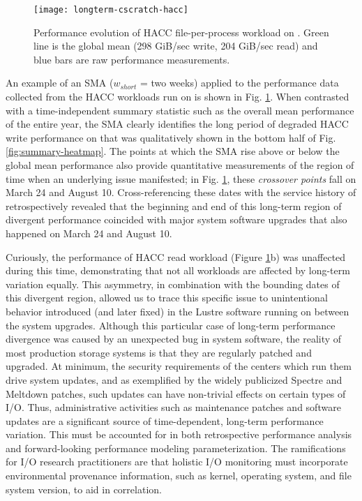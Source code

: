 \begin{figure}
    \centering
    \texttt{[image: longterm-cscratch-hacc]}
    \vspace{-.35in}
    \caption{Performance evolution of HACC file-per-process workload on \cori.  Green line is the global mean (298 GiB/sec write, 204 GiB/sec read) and blue bars are raw performance measurements.}
    \label{fig:timeseries-baseline}
\end{figure}


An example of an SMA ($w_{short}$ = two weeks) applied to the performance data collected from the HACC workloads run on \cori is shown in Fig. \ref{fig:timeseries-baseline}.
When contrasted with a time-independent summary statistic such as the overall mean performance of the entire year, the SMA clearly identifies the long period of degraded HACC write performance on \cori that was qualitatively shown in the bottom half of Fig. \ref{fig:summary-heatmap}.
The points at which the SMA rise above or below the global mean performance also provide quantitative measurements of the region of time when an underlying issue manifested;
in Fig. \ref{fig:timeseries-baseline}, these \emph{crossover points} fall on March 24 and August 10.
Cross-referencing these dates with the service history of \cori retrospectively revealed that the beginning and end of this long-term region of divergent performance coincided with major system software upgrades that also happened on March 24 and August 10.

Curiously, the performance of HACC read workload (Figure \ref{fig:timeseries-baseline}b) was unaffected during this time, demonstrating that not all workloads are affected by long-term variation equally.
This asymmetry, in combination with the bounding dates of this divergent region, allowed us to trace this specific issue to unintentional behavior introduced (and later fixed) in the Lustre software running on \cori between the system upgrades.
Although this particular case of long-term performance divergence was caused by an unexpected bug in system software, the reality of most production storage systems is that they are regularly patched and upgraded.
At minimum, the security requirements of the centers which run them drive system updates, and as exemplified by the widely publicized Spectre and Meltdown patches, such updates can have non-trivial effects on certain types of I/O.
Thus, administrative activities such as maintenance patches and software updates are a significant source of time-dependent, long-term performance variation.
This must be accounted for in both retrospective performance analysis and forward-looking performance modeling parameterization.  
The ramifications for I/O research practitioners are that holistic I/O monitoring must incorporate environmental provenance information, such as kernel, operating system, and file system version, to aid in correlation.

